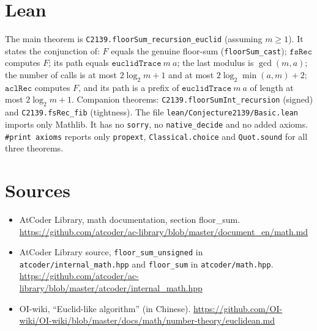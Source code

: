 \documentclass[11pt]{article}
\theoremstyle{definition}
\begin{document}
\section{Lean}
The main theorem is \texttt{C2139.floorSum\_recursion\_euclid} (assuming $m\ge1$). It states the
conjunction of: $F$ equals the genuine floor-sum (\texttt{floorSum\_cast}); $\mathtt{fsRec}$ computes
$F$; its path equals $\mathtt{euclidTrace}\ m\ a$; the last modulus is $\gcd(m,a)$; the number of
calls is at most $2\log_2m+1$ and at most $2\log_2\min(a,m)+2$; $\mathtt{aclRec}$ computes $F$, and
its path is a prefix of $\mathtt{euclidTrace}\ m\ a$ of length at most $2\log_2m+1$. Companion
theorems: \texttt{C2139.floorSumInt\_recursion} (signed) and \texttt{C2139.fsRec\_fib} (tightness).
The file \texttt{lean/Conjecture2139/Basic.lean} imports only Mathlib. It has no \texttt{sorry}, no
\texttt{native\_decide} and no added axioms. \texttt{\#print axioms} reports only
\texttt{propext}, \texttt{Classical.choice} and \texttt{Quot.sound} for all three theorems.

\section*{Sources}
\begin{itemize}
\item[{[ACL-doc]}] AtCoder Library, math documentation, section floor\_sum.
\url{https://github.com/atcoder/ac-library/blob/master/document_en/math.md}
\item[{[ACL-code]}] AtCoder Library source, \texttt{floor\_sum\_unsigned} in \texttt{atcoder/internal\_math.hpp} and \texttt{floor\_sum} in \texttt{atcoder/math.hpp}.
\url{https://github.com/atcoder/ac-library/blob/master/atcoder/internal_math.hpp}
\item[{[OI-wiki]}] OI-wiki, ``Euclid-like algorithm'' (in Chinese).
\url{https://github.com/OI-wiki/OI-wiki/blob/master/docs/math/number-theory/euclidean.md}
\end{itemize}
\end{document}
